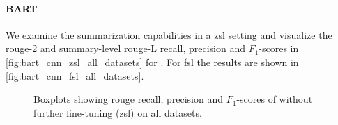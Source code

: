 \paragraph{BART}

We examine the summarization capabilities in a \ac{zsl} setting
and visualize the \acs*{rouge}-2 and summary-level \acs*{rouge}-L recall, precision and \(F_1\)-scores
in \autoref{fig:bart_cnn_zsl_all_datasets} for .
For \ac{fsl} the results are shown in \autoref{fig:bart_cnn_fsl_all_datasets}.

\begin{figure}[htbp]
\centering
{}%
\hfill{}%
%
\hfill{}%
\caption{Boxplots showing \acs*{rouge} recall, precision and \(F_1\)-scores
of  without further fine-tuning (\acs*{zsl}) on all datasets.}
\label{fig:bart_cnn_zsl_all_datasets}
\end{figure}

